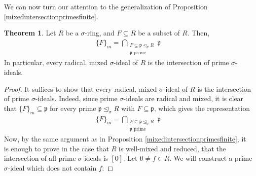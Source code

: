 \documentclass{article}
\def\p{\mathfrak{p}}
\def\s{\sigma}
\def\si{\unlhd_{\sigma}}
\newenvironment{bew}{\begin{proof}[Proof]}{\end{proof}}
\theoremstyle{definition}
\newtheorem{theorem}[Satz]{Theorem}
\begin{document}
We can now turn our attention to the generalization of Proposition \ref{mixedintersectionprimesfinite}. 


\begin{theorem}\label{intersectionprimes}
Let $R$ be a $\s$-ring, and $F \subseteq R$ be a subset of $R$. Then, 
\begin{align*} \{F\}_m = \bigcap_{\substack{F \subseteq \p \si R \\ \p \text{ prime}}} \p \end{align*}
In particular, every radical, mixed $\s$-ideal of $R$ is the intersection of prime $\s$-ideals.
\begin{bew}
It suffices to show that every radical, mixed $\s$-ideal of $R$ is the intersection of prime $\s$-ideals.
Indeed, since prime $\s$-ideals are radical and mixed, it is clear that $\{F\}_m \subseteq \p$ for every prime $\p \si R$ with $F \subseteq \p$, which gives the representation 
\begin{align*} \{F\}_m = \bigcap_{\substack{F \subseteq \p \si R \\ \p \text{ prime}}} \p \end{align*}
Now, by the same argument as in Proposition \ref{mixedintersectionprimesfinite}, it is enough to prove in the case that $R$ is well-mixed and reduced, that the intersection of all prime $\s$-ideals is $[0]$.
Let $0 \neq f \in R$. We will construct a prime $\s$-ideal which does not contain $f$: 


\end{bew}
\end{theorem}
\end{document}
